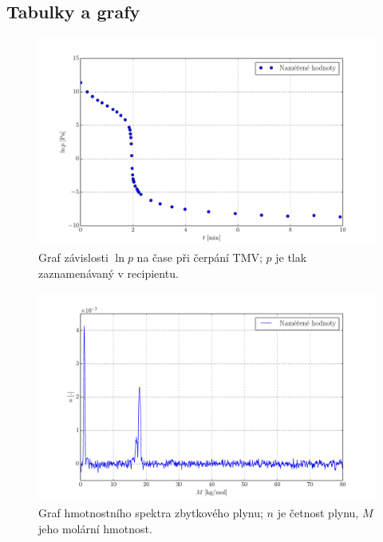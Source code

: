 \documentclass[english]{article}
\begin{document}
\clearpage
\subsection{Tabulky a grafy}

\begin{figure}[h!]
	\begin{center}
		\vspace*{-0.5cm}
		\includegraphics[width=\linewidth]{../plt/04_lnp.pdf}
		\vspace*{-0,7cm}
		\caption{Graf závislosti $\ln p$ na čase při čerpání TMV; $p$ je tlak zaznamenávaný v recipientu. }
		\label{fig:g_lnp}
	\end{center}
\end{figure}

\begin{figure}[h!]
	\begin{center}
		\vspace*{-1cm}
		\includegraphics[width=\linewidth]{../plt/01_test.pdf}
		\vspace*{-0,7cm}
		\caption{Graf hmotnostního spektra zbytkového plynu; $n$ je četnost plynu, $M$ jeho molární hmotnost. } %
		\label{fig:g_spektrum}
	\end{center}
\end{figure}
\end{document}
